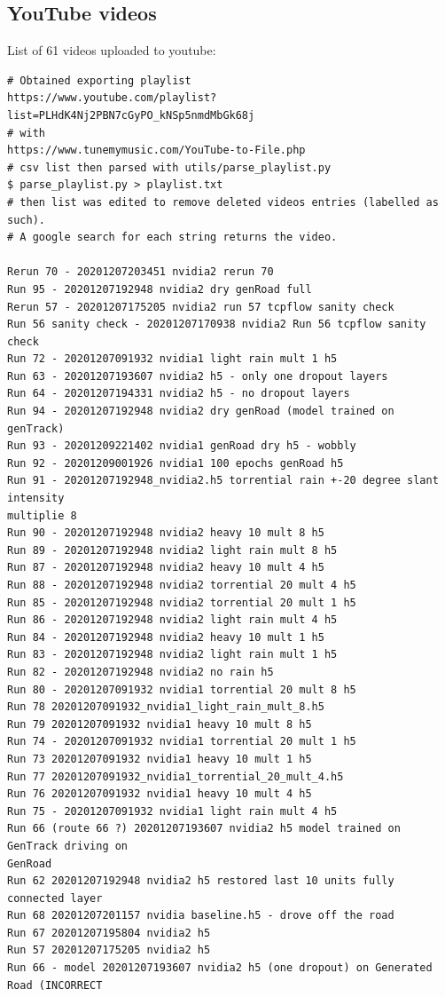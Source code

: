 \subsection{YouTube videos}
List of 61 videos uploaded to youtube:
\begin{verbatim}
# Obtained exporting playlist
https://www.youtube.com/playlist?list=PLHdK4Nj2PBN7cGyPO_kNSp5nmdMbGk68j
# with
https://www.tunemymusic.com/YouTube-to-File.php
# csv list then parsed with utils/parse_playlist.py
$ parse_playlist.py > playlist.txt
# then list was edited to remove deleted videos entries (labelled as such).
# A google search for each string returns the video.

Rerun 70 - 20201207203451 nvidia2 rerun 70
Run 95 - 20201207192948 nvidia2 dry genRoad full
Rerun 57 - 20201207175205 nvidia2 run 57 tcpflow sanity check
Run 56 sanity check - 20201207170938 nvidia2 Run 56 tcpflow sanity check
Run 72 - 20201207091932 nvidia1 light rain mult 1 h5
Run 63 - 20201207193607 nvidia2 h5 - only one dropout layers
Run 64 - 20201207194331 nvidia2 h5 - no dropout layers
Run 94 - 20201207192948 nvidia2 dry genRoad (model trained on genTrack)
Run 93 - 20201209221402 nvidia1 genRoad dry h5 - wobbly
Run 92 - 20201209001926 nvidia1 100 epochs genRoad h5
Run 91 - 20201207192948_nvidia2.h5 torrential rain +-20 degree slant intensity
multiplie 8
Run 90 - 20201207192948 nvidia2 heavy 10 mult 8 h5
Run 89 - 20201207192948 nvidia2 light rain mult 8 h5
Run 87 - 20201207192948 nvidia2 heavy 10 mult 4 h5
Run 88 - 20201207192948 nvidia2 torrential 20 mult 4 h5
Run 85 - 20201207192948 nvidia2 torrential 20 mult 1 h5
Run 86 - 20201207192948 nvidia2 light rain mult 4 h5
Run 84 - 20201207192948 nvidia2 heavy 10 mult 1 h5
Run 83 - 20201207192948 nvidia2 light rain mult 1 h5
Run 82 - 20201207192948 nvidia2 no rain h5
Run 80 - 20201207091932 nvidia1 torrential 20 mult 8 h5
Run 78 20201207091932_nvidia1_light_rain_mult_8.h5
Run 79 20201207091932 nvidia1 heavy 10 mult 8 h5
Run 74 - 20201207091932 nvidia1 torrential 20 mult 1 h5
Run 73 20201207091932 nvidia1 heavy 10 mult 1 h5
Run 77 20201207091932_nvidia1_torrential_20_mult_4.h5
Run 76 20201207091932 nvidia1 heavy 10 mult 4 h5
Run 75 - 20201207091932 nvidia1 light rain mult 4 h5
Run 66 (route 66 ?) 20201207193607 nvidia2 h5 model trained on GenTrack driving on
GenRoad
Run 62 20201207192948 nvidia2 h5 restored last 10 units fully connected layer
Run 68 20201207201157 nvidia baseline.h5 - drove off the road
Run 67 20201207195804 nvidia2 h5
Run 57 20201207175205 nvidia2 h5
Run 66 - model 20201207193607 nvidia2 h5 (one dropout) on Generated Road (INCORRECT

\end{verbatim}
